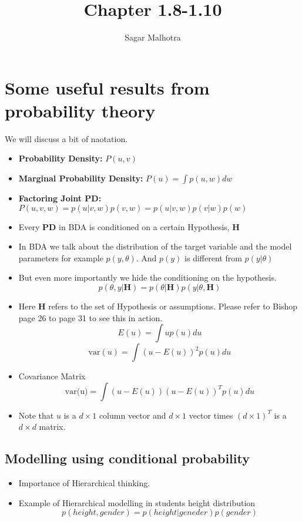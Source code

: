 \documentclass{article}
\title{Chapter 1.8-1.10}
\author{Sagar Malhotra}
\begin{document}
\maketitle
\newpage
\section*{Some useful results from probability theory}
We will discuss a bit of naotation.
\begin{itemize}
        \item \textbf{Probability Density:} $P(u,v)$
        \item \textbf{Marginal Probability Density:} $P(u) = \int p(u,w)dw$
        \item \textbf{Factoring Joint PD:} $P(u,v,w) = p(u|v,w)p(v,w) = p(u|v,w)p(v|w)p(w)$
        \item Every \textbf{PD} in BDA is conditioned on a certain Hypothesis, \textbf{H}
        \item In BDA we talk about the distribution of the target variable and the model parameters for example $p(y,\theta)$. And $p(y)$ is different from $p(y|\theta)$
        \item But even more importantly we hide the conditioning on the hypothesis.                             $$p(\theta,y| \textbf{H} ) = p(\theta| \textbf{H})p(y| \theta, \textbf{H}  )$$
        \item Here $ \textbf{H} $ refers to the set of Hypothesis or assumptions. Please refer to Bishop page 26 to page 31 to see this in action.
            $$E(u) = \int up(u)du$$
            $$ \text{var}(u) = \int (u - E(u))^{2}p(u)du$$

        \item Covariance Matrix
            $$ \text{var(u)} = \int (u-E(u))(u - E(u))^{T} p(u)du$$
        \item Note that $u$ is a $d\times 1$ column vector and $d \times 1$ vector times $(d \times1)^{T} $ is a $d \times d $ matrix.



\end{itemize}

\subsection*{Modelling using conditional probability}
\begin{itemize}
\item Importance of Hierarchical thinking. 
\item Example of Hierarchical modelling in students height distribution
    $$p(height,gender) = p(height|geneder)p(gender)$$
\end{itemize}
\end{document}
